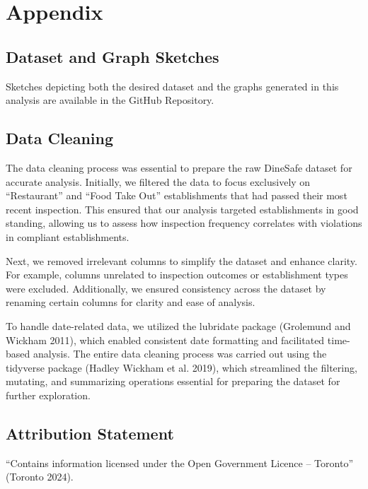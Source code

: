 \documentclass[
  letterpaper,
  DIV=11,
  numbers=noendperiod]{scrartcl}
\begin{document}
\newpage

\appendix

\section{Appendix}\label{sec-appendix}

\subsection{Dataset and Graph Sketches}\label{sec-appendix-sketches}

Sketches depicting both the desired dataset and the graphs generated in
this analysis are available in the GitHub Repository.

\subsection{Data Cleaning}\label{sec-appendix-cleaning}

The data cleaning process was essential to prepare the raw DineSafe
dataset for accurate analysis. Initially, we filtered the data to focus
exclusively on ``Restaurant'' and ``Food Take Out'' establishments that
had passed their most recent inspection. This ensured that our analysis
targeted establishments in good standing, allowing us to assess how
inspection frequency correlates with violations in compliant
establishments.

Next, we removed irrelevant columns to simplify the dataset and enhance
clarity. For example, columns unrelated to inspection outcomes or
establishment types were excluded. Additionally, we ensured consistency
across the dataset by renaming certain columns for clarity and ease of
analysis.

To handle date-related data, we utilized the lubridate package
(Grolemund and Wickham 2011), which enabled consistent date formatting
and facilitated time-based analysis. The entire data cleaning process
was carried out using the tidyverse package (Hadley Wickham et al.
2019), which streamlined the filtering, mutating, and summarizing
operations essential for preparing the dataset for further exploration.

\subsection{Attribution Statement}\label{sec-appendix-attribution}

``Contains information licensed under the Open Government Licence --
Toronto'' (Toronto 2024).
\end{document}

